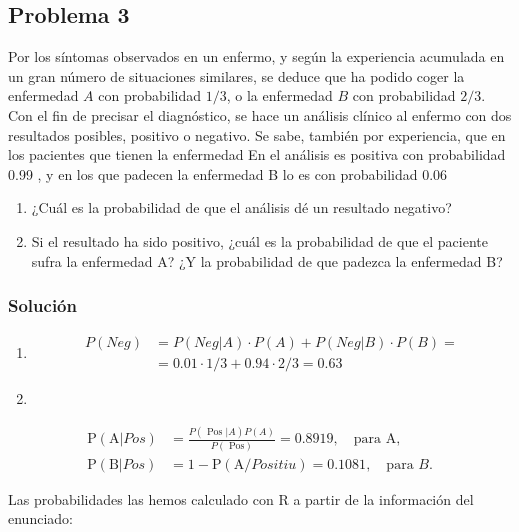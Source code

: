 \documentclass[
]{article}
\begin{document}
\subsection{Problema 3}\label{problema-3}

Por los síntomas observados en un enfermo, y según la experiencia acumulada en un gran número de situaciones similares, se deduce que ha podido coger la enfermedad \(A\) con probabilidad \(1 / 3\), o la enfermedad \(B\) con probabilidad \(2 / 3\). Con el fin de precisar el diagnóstico, se hace un análisis clínico al enfermo con dos resultados posibles, positivo o negativo. Se sabe, también por experiencia, que en los pacientes que tienen la enfermedad En el análisis es positiva con probabilidad 0.99 , y en los que padecen la enfermedad B lo es con probabilidad 0.06

\begin{enumerate}
\def\labelenumi{\alph{enumi})}
\item
  ¿Cuál es la probabilidad de que el análisis dé un
  resultado negativo?
\item
  Si el resultado ha sido positivo, ¿cuál es la probabilidad de que el paciente sufra la enfermedad A? ¿Y la probabilidad de que padezca la enfermedad B?
\end{enumerate}

\subsubsection{Solución}\label{soluciuxf3n-2}

\begin{enumerate}
\def\labelenumi{\alph{enumi}.}
\item
  \[
  \begin{aligned}
  P(Neg)&=P(Neg|A) \cdot  P(A)+P(Neg|B) \cdot  P(B)=
  \\&= 0.01 \cdot 1 / 3+0.94 \cdot 2 / 3=0.63
  \end{aligned}
  \]
\item
\end{enumerate}

\[
\begin{aligned}
\mathrm{P}(\mathrm{A} | Pos )&=\frac{P(\text { Pos } | A) P(A)}{P(\text { Pos})}=0.8919, \quad \text{para A},\\
\mathrm{P}(\mathrm{B} | Pos)&=1-\mathrm{P}(\mathrm{A} / Positiu )=0.1081, \quad \text{para $B$}.
\end{aligned}
\]

Las probabilidades las hemos calculado con R a partir de la información del enunciado:
\end{document}
